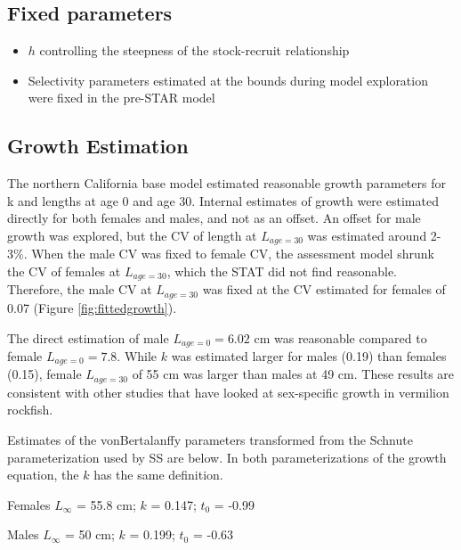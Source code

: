 \documentclass[
  english,
  a4paper,
]{article}
\providecommand{\tightlist}{%
  \setlength{\itemsep}{0pt}\setlength{\parskip}{0pt}}
\begin{document}
\hypertarget{fixed-parameters}{%
\subsection{Fixed parameters}\label{fixed-parameters}}

\begin{itemize}
\tightlist
\item
  \(h\) controlling the steepness of the stock-recruit relationship
\item
  Selectivity parameters estimated at the bounds during model exploration were fixed in the pre-STAR model
\end{itemize}

\hypertarget{growth-estimation}{%
\subsection{Growth Estimation}\label{growth-estimation}}

The northern California base model estimated reasonable growth parameters for k and lengths at age 0 and age 30. Internal estimates of growth were estimated directly for both females and males, and not as an offset. An offset for male growth was explored, but the CV of length at \(L_{age=30}\) was estimated around 2-3\%. When the male CV was fixed to female CV, the assessment model shrunk the CV of females at \(L_{age=30}\), which the STAT did not find reasonable. Therefore, the male CV at \(L_{age=30}\) was fixed at the CV estimated for females of 0.07 (Figure \ref{fig:fittedgrowth}).

The direct estimation of male \(L_{age=0}=6.02\) cm was reasonable compared to female \(L_{age=0}=7.8\). While \(k\) was estimated larger for males (0.19) than females (0.15), female \(L_{age=30}\) of 55 cm was larger than males at 49 cm. These results are consistent with other studies that have looked at sex-specific growth in vermilion rockfish.

Estimates of the vonBertalanffy parameters transformed from the Schnute parameterization used by SS are below. In both parameterizations of the growth equation, the \(k\) has the same definition.

\begin{centering}

Females $L_{\infty}$ = 55.8 cm; $k$ = 0.147; $t_0$ = -0.99

Males $L_{\infty}$ = 50 cm; $k$ = 0.199; $t_0$ = -0.63

\end{centering}
\end{document}
